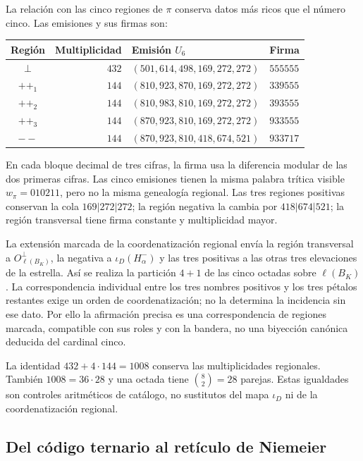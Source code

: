La relación con las cinco regiones de $\pi$ conserva datos más ricos
que el número cinco. Las emisiones y sus firmas son:
\begin{center}
\small
\begin{tabular}{@{}crll@{}}
\toprule
Región & Multiplicidad & Emisión $U_6$ & Firma \\
\midrule
$\perp$ & $432$ & $(501,614,498,169,272,272)$ & $555555$ \\
$++_1$ & $144$ & $(810,923,870,169,272,272)$ & $339555$ \\
$++_2$ & $144$ & $(810,983,810,169,272,272)$ & $393555$ \\
$++_3$ & $144$ & $(870,923,810,169,272,272)$ & $933555$ \\
$--$ & $144$ & $(870,923,810,418,674,521)$ & $933717$ \\
\bottomrule
\end{tabular}
\end{center}
En cada bloque decimal de tres cifras, la firma usa la diferencia
modular de las dos primeras cifras. Las cinco emisiones tienen la
misma palabra trítica visible $w_\pi=010211$, pero no la misma
genealogía regional. Las tres regiones positivas conservan la cola
$169|272|272$; la región negativa la cambia por $418|674|521$;
la región transversal tiene firma constante y multiplicidad mayor.

La extensión marcada de la coordenatización regional envía la región transversal
a $O_{\ell(B_K)}^\perp$, la negativa a $\iota_D(H^-_\alpha)$ y las
tres positivas a las otras tres elevaciones de la estrella. Así se
realiza la partición $4+1$ de las cinco octadas sobre $\ell(B_K)$.
La correspondencia individual entre los tres nombres positivos y
los tres pétalos restantes exige un orden de coordenatización; no la determina
la incidencia sin ese dato. Por ello la afirmación precisa es una
correspondencia de regiones marcada, compatible con sus roles y con
la bandera, no una biyección canónica deducida del cardinal cinco.

La identidad $432+4\cdot144=1008$ conserva las multiplicidades
regionales. También $1008=36\cdot28$ y una octada tiene
$\binom82=28$ parejas. Estas igualdades son controles aritméticos de
catálogo, no sustitutos del mapa $\iota_D$ ni de la coordenatización regional.



\subsection{Del código ternario al retículo de Niemeier}
\label{exc:niemeier}

